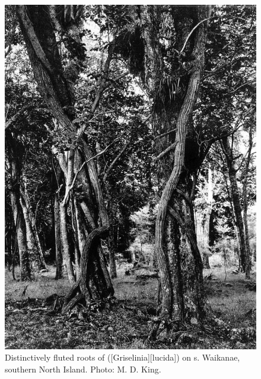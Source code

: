 \begin{figure}[t]
	\begin{minipage}[t]{\textwidth}
		\begin{minipage}[t]{(\textwidth-\fgap) * \real{0.495}}
			\centering
			\includegraphics[width=\textwidth]{graphics/fig_046}
			\caption[Distinctively fluted roots of puka on kohekohes]{Distinctively fluted roots of  ([Griselinia][lucida]) on s.
			Waikanae, southern North Island.
			Photo: M. D. King.}%
			\label{fig:46puka-roots}
		\end{minipage}\hspace{\fgap}%
		\begin{minipage}[t]{(\textwidth-\fgap) * \real{0.505}}
			\centering

\end{minipage}
\end{minipage}
\end{figure}
